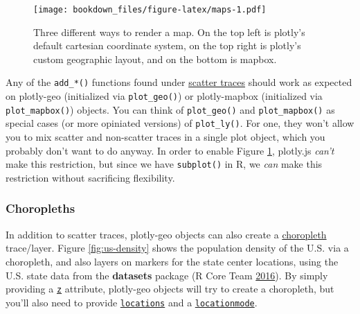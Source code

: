 \documentclass[12pt,]{isuthesis}
\begin{document}
\begin{figure}[htbp]
\centering
\texttt{[image: bookdown\_files/figure-latex/maps-1.pdf]}
\caption{\label{fig:maps}Three different ways to render a map. On the top
left is plotly's default cartesian coordinate system, on the top right
is plotly's custom geographic layout, and on the bottom is mapbox.}
\end{figure}

Any of the \texttt{add\_*()} functions found under
\href{https://cpsievert.github.io/plotly_book/scatter-traces.html}{scatter
traces} should work as expected on plotly-geo (initialized via
\texttt{plot\_geo()}) or plotly-mapbox (initialized via
\texttt{plot\_mapbox()}) objects. You can think of \texttt{plot\_geo()}
and \texttt{plot\_mapbox()} as special cases (or more opiniated
versions) of \texttt{plot\_ly()}. For one, they won't allow you to mix
scatter and non-scatter traces in a single plot object, which you
probably don't want to do anyway. In order to enable Figure
\ref{fig:maps}, plotly.js \emph{can't} make this restriction, but since
we have \texttt{subplot()} in R, we \emph{can} make this restriction
without sacrificing flexibility.

\subsubsection{Choropleths}\label{choropleths}

In addition to scatter traces, plotly-geo objects can also create a
\href{https://plot.ly/r/reference/\#choropleth}{choropleth} trace/layer.
Figure \ref{fig:us-density} shows the population density of the U.S. via
a choropleth, and also layers on markers for the state center locations,
using the U.S. state data from the \textbf{datasets} package (R Core
Team \protect\hyperlink{ref-base}{2016}). By simply providing a
\href{https://plot.ly/r/reference/\#choropleth-z}{\texttt{z}} attribute,
plotly-geo objects will try to create a choropleth, but you'll also need
to provide
\href{https://plot.ly/r/reference/\#choropleth-locations}{\texttt{locations}}
and a
\href{https://plot.ly/r/reference/\#choropleth-locationmode}{\texttt{locationmode}}.
\end{document}
